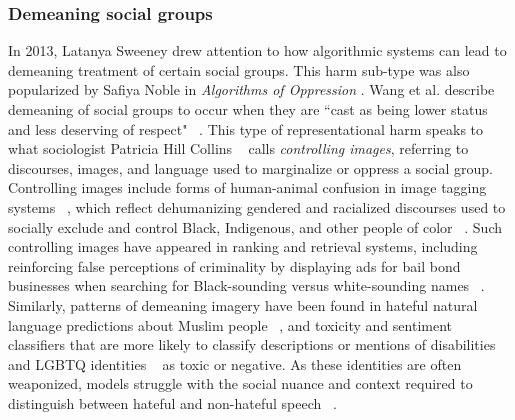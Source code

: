 \subsubsection{Demeaning social groups} In 2013, Latanya Sweeney \cite{Sweeney_2013} drew attention to how algorithmic systems can lead to demeaning treatment of certain social groups. This harm sub-type was also popularized by Safiya Noble in \textit{Algorithms of Oppression} \cite{Noble_2018}. Wang et al. describe demeaning of social groups to occur when they are ``cast as being lower status and less deserving of respect" ~\cite[p. 5]{Wang_Barocas_Laird_Wallach_2022}. This type of representational harm speaks to what sociologist Patricia Hill Collins ~\cite{Collins_1999} calls \textit{controlling images}, referring to discourses, images, and language used to marginalize or oppress a social group. Controlling images include forms of human-animal confusion in image tagging systems ~\cite{Vincent_2018}, which reflect dehumanizing gendered and racialized discourses used to socially exclude and control Black, Indigenous, and other people of color ~\cite{Goff_Eberhardt_Williams_Jackson_2008}. Such controlling images have appeared in ranking and retrieval systems, including reinforcing false perceptions of criminality by displaying ads for bail bond businesses when searching for Black-sounding versus white-sounding names ~\cite{Sweeney_2013}. Similarly, patterns of demeaning imagery have been found in hateful natural language predictions about Muslim people ~\cite{Abid_Farooqi_Zou_2021}, and toxicity and sentiment classifiers that are more likely to classify descriptions or mentions of disabilities ~\cite{Sweeney_2013, Hutchinson_Prabhakaran_Denton_2020} and LGBTQ identities ~\cite{Welbl_2021, Thiago_Marcelo_Gomes_2021} as toxic or negative. As these identities are often weaponized, models struggle with the social nuance and context required to distinguish between hateful and non-hateful speech ~\cite{Welbl_2021}.

